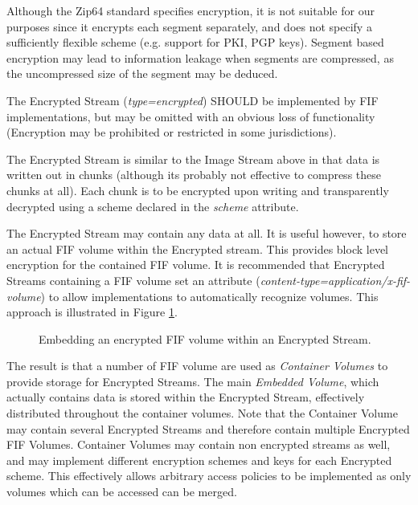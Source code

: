 \documentclass[10pt, conference]{IEEEtran}
\begin{document}
Although the Zip64 standard specifies encryption, it is not suitable
for our purposes since it encrypts each segment separately, and does
not specify a sufficiently flexible scheme (e.g. support for PKI, PGP
keys). Segment based encryption may lead to information leakage when
segments are compressed, as the uncompressed size of the segment may
be deduced.

The Encrypted Stream ({\em type=encrypted}) SHOULD be implemented by
FIF implementations, but may be omitted with an obvious loss of
functionality (Encryption may be prohibited or restricted in some
jurisdictions).

The Encrypted Stream is similar to the Image Stream above in that data
is written out in chunks (although its probably not effective to
compress these chunks at all). Each chunk is to be encrypted upon
writing and transparently decrypted using a scheme declared in the
{\em scheme} attribute. 

The Encrypted Stream may contain any data at all. It is useful
however, to store an actual FIF volume within the Encrypted
stream. This provides block level encryption for the contained FIF
volume. It is recommended that Encrypted Streams containing a FIF
volume set an attribute ({\em content-type=application/x-fif-volume})
to allow implementations to automatically recognize volumes. This
approach is illustrated in Figure \ref{crypted_fif}.

\begin{figure}[tb]
  \begin{center}
  \mbox{\columnwidth {}}
  \caption{Embedding an encrypted FIF volume within an Encrypted Stream.}
  \label{crypted_fif}
  \end{center}
\end{figure}

The result is that a number of FIF volume are used as {\em Container
Volumes} to provide storage for Encrypted Streams. The main {\em
Embedded Volume}, which actually contains data is stored within the
Encrypted Stream, effectively distributed throughout the container
volumes. Note that the Container Volume may contain several Encrypted
Streams and therefore contain multiple Encrypted FIF
Volumes. Container Volumes may contain non encrypted streams as well,
and may implement different encryption schemes and keys for each
Encrypted scheme. This effectively allows arbitrary access policies to
be implemented as only volumes which can be accessed can be merged.
\end{document}
